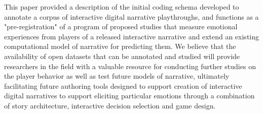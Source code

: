 This paper provided a description of the initial coding schema
developed to annotate a corpus of interactive digital narrative
playthroughs, and functions as a "pre-registration" of a program of
proposed studies that measure emotional experiences from players of a
released interactive narrative and extend an existing computational
model of narrative for predicting them. We believe that the
availability of open datasets that can be annotated and studied will
provide researchers in the field with a valuable resource for
conducting further studies on the player behavior as well as test
future models of narrative, ultimately facilitating future authoring
tools designed to support creation of interactive digital narratives
to support eliciting particular emotions through a combination of
story architecture, interactive decision selection and game design.
